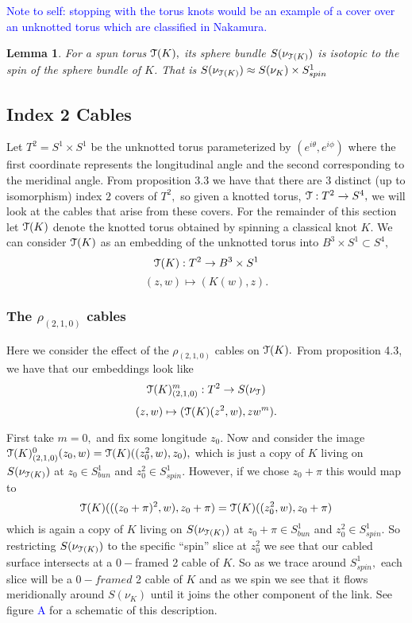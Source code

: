 \documentclass[a4paper, 12 pt, reqno]{amsart}
\newtheorem{lemma}[theorem]{Lemma}
\theoremstyle{definition}
\theoremstyle{remark}
\begin{document}
\textcolor{blue}{Note to self: stopping with the torus knots would be an example of a cover over an unknotted torus which are classified in Nakamura.}


\begin{lemma}
For a spun torus $\mathcal T(K),$ its sphere bundle $S(\nu_{\mathcal T(K)})$ is isotopic to the spin of the sphere bundle of $K$. That is $S(\nu_{\mathcal T(K)}) \approx S(\nu_{K}) \times S^{1}_{spin}$
\end{lemma}


\subsection{Index 2 Cables}
Let $T^{2} = S^{1} \times S^{1}$ be the unknotted torus parameterized by $(e^{i\theta}, e^{i\phi})$ where the first coordinate represents the longitudinal angle and the second corresponding to the meridinal angle. From proposition 3.3 we have that there are $3$ distinct (up to isomorphism) index $2$ covers of $T^{2},$ so given a knotted torus, $\mathcal T: T^{2} \rightarrow S^{4},$ we will look at the cables that arise from these covers. \newline
\indent For the remainder of this section let $\mathcal T(K)$ denote the knotted torus obtained by spinning a classical knot $K.$ We can consider $\mathcal T(K)$ as an embedding of the unknotted torus into $B^{3} \times S^{1} \subset S^{4},$ $$\mathcal T(K): T^{2} \rightarrow B^{3} \times S^{1}$$ $$(z, w) \mapsto (K(w), z).$$


\subsubsection{The $\rho_{(2,1,0)}$ cables} Here we consider the effect of the $\rho_{(2,1,0)}$ cables on $\mathcal T(K).$ From proposition 4.3, we have that our embeddings look like $$\mathcal T(K)^{m}_{(2, 1, 0)}: T^{2} \rightarrow S(\nu_{\mathcal T})$$ $$(z, w) \mapsto (\mathcal T(K)(z^{2}, w), zw^{m}  ).$$ 

First take $m = 0,$ and fix some longitude $z_{0}.$ Now and consider the image $\mathcal T(K)^{0}_{(2, 1, 0)}(z_{0}, w) = \mathcal T(K)((z_{0}^{2}, w), z_{0}),$ which is just a copy of $K$ living on $S(\nu_{\mathcal T(K)})$ at $z_{0} \in S^{1}_{bun}$ and $z_{0}^{2} \in S^{1}_{spin}.$ However, if we chose $z_{0} + \pi$ this would map to $$\mathcal T(K)(((z_{0} + \pi)^{2}, w), z_{0} + \pi) = \mathcal T(K)((z_{0}^{2}, w), z_{0} + \pi)$$ which is again a copy of $K$ living on $S(\nu_{\mathcal T(K)})$ at $z_{0} + \pi \in S^{1}_{bun}$ and $z_{0}^{2} \in S^{1}_{spin}.$ So restricting $S(\nu_{\mathcal T(K)})$ to the specific ``spin'' slice at $z_{0}^{2}$ we see that our cabled surface intersects at a $0-$framed 2 cable of $K.$ So as we trace around $S^{1}_{spin},$ each slice will be a $0-framed$ 2 cable of $K$ and as we spin we see that it flows meridionally around $S(\nu_{K})$ until it joins the other component of the link. See figure \textcolor{blue}{A} for a schematic of this description. 
\end{document}
